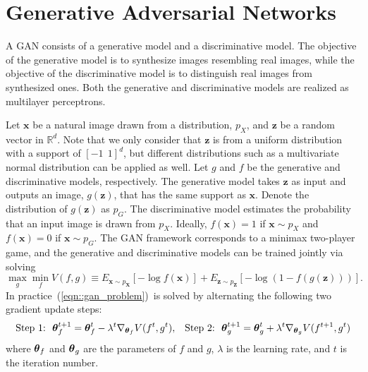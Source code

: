 \section{Generative Adversarial Networks}\label{sec::gan}

A GAN consists of a generative model and a discriminative model. The objective of the generative model is to synthesize images resembling real images, while the objective of the discriminative model is to distinguish real images from synthesized ones. Both the generative and discriminative models are realized as multilayer perceptrons. 

Let $\mathbf{x}$ be a natural image drawn from a distribution, $p_{X}$, and $\mathbf{z}$ be a random vector in $\mathbb{R}^d$. Note that we only consider that $\mathbf{z}$ is from a uniform distribution with a support of $[-1\medspace\medspace 1]^d$, but different distributions such as a multivariate normal distribution can be applied as well. Let $g$ and $f$ be the generative and discriminative models, respectively. The generative model takes $\mathbf{z}$ as input and outputs an image, $g(\mathbf{z})$, that has the same support as $\mathbf{x}$. Denote the distribution of $g(\mathbf{z})$ as $p_{G}$. The discriminative model estimates the probability that an input image is drawn from $p_{X}$. Ideally, $f(\mathbf{x})=1$ if $\mathbf{x}\sim p_{X}$ and $f(\mathbf{x})=0$ if $\mathbf{x}\sim p_{G}$. The GAN framework corresponds to a minimax two-player game, and the generative and discriminative models can be trained jointly via solving 
\begin{equation}
\max_{g} \min_{f} V(f,g) \equiv E_{ \mathbf{x} \sim p_{\mathbf{X}}} [ - \log f(\mathbf{x}) ] + E_{\mathbf{z}\sim p_{\mathbf{Z}}} [ - \log( 1 - f(g(\mathbf{z}))) ].
 \label{eqn::gan_problem}
\end{equation}
In practice~(\ref{eqn::gan_problem})~is solved by alternating the following two gradient update steps:
\begin{align}
&\text{Step 1: }\medspace  \text{\boldmath$\theta$}_f^{t+1} = \text{\boldmath$\theta$}_f^{t} - \lambda^t\nabla_{\text{\boldmath$\theta$}_f} V(f^{t},g^{t}),
&\text{Step 2: }\medspace  \text{\boldmath$\theta$}_g^{t+1} = \text{\boldmath$\theta$}_g^{t} + \lambda^t\nabla_{\text{\boldmath$\theta$}_g} V(f^{t+1},g^{t})\nonumber
\end{align}
where $\text{\boldmath$\theta$}_f$ and $\text{\boldmath$\theta$}_g$ are the parameters of $f$ and $g$, $\lambda$ is the learning rate, and $t$ is the iteration number. %

